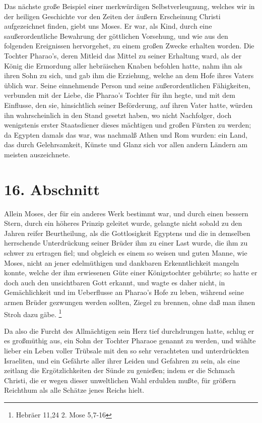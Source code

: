  Das nächste große Beispiel einer merkwürdigen
Selbstverleugnung, welches wir in
der heiligen Geschichte vor den Zeiten der äußern Erscheinung Christi
aufgezeichnet finden, giebt uns Moses. Er war, als Kind, durch eine
saußerordentliche Bewahrung der göttlichen Vorsehung, und wie aus den folgenden
Ereignissen hervorgehet, zu einem großen Zwecke erhalten worden. Die Tochter
Pharao’s,  deren Mitleid das Mittel zu seiner Erhaltung ward, als der König die
Ermordung aller hebräischen Knaben befohlen hatte, nahm ihn als ihren Sohn zu
sich, und gab ihm die Erziehung, welche an dem Hofe ihres Vaters üblich war.
Seine einnehmende Person und seine außerordentlichen Fähigkeiten, verbunden mit
der Liebe, die Pharao’s Tochter für ihn hegte, und mit dem Einflusse, den sie,
hinsichtlich seiner Beförderung, auf ihren Vater hatte, würden ihn
wahrscheinlich in den Stand gesetzt haben, wo nicht Nachfolger, doch wenigstenis
erster Staatsdiener dieses mächtigen und großen Fürsten zu werden; da
Egypten  damals das war, was nachmalß Athen
 und Rom  wurden: ein Land, das
durch Gelehrsamkeit, Künste und Glanz sich vor allen andern Ländern am meisten
auszeichnete.

\section{16. Abschnitt} \label{kap4_ab16}

Allein Moses, der für ein anderes Werk bestimmt war, und durch einen bessern
Stern, durch ein höheres Prinzip geleitet wurde, gelangte nicht sobald zu den
Jahren reifer Beurtheilung, als die Gottlosigkeit Egyptens und die in demselben
herrschende Unterdrückung seiner Brüder ihm zu einer Last wurde, die ihm zu
schwer zu ertragen fiel; und obgleich es einem so weisen und guten Manne, wie
Moses, nicht an jener edelmüthigen und dankbaren Erkenntlichkeit mangeln
konnte, welche der ihm erwiesenen Güte einer Königstochter gebührte; so hatte er
doch auch den unsichtbaren Gott erkannt, und wagte es daher nicht, in
Gemächlichkeit und im Ueberflusse an Pharao's Hofe zu leben, während seine armen
Brüder gezwungen werden sollten, Ziegel zu brennen, ohne daß man ihnen Stroh
dazu gäbe.
\footnote{Hebräer 11,24 2. Mose 5,7-16}

\medskip

Da also die Furcht des Allmächtigen sein Herz tief durchdrungen hatte, schlug er
es großmüthig aus, ein Sohn der Tochter Pharaoe genannt zu werden, und wählte
lieber ein Leben voller Trübsale mit den so sehr verachteten und unterdrückten
Israeliten, und ein Gefährte aller ihrer Leiden und Gefahren zu sein, als eine
zeitlang die Ergötzlichkeiten der Sünde zu genießen; indem er die Schmach
Christi, die er wegen dieser unweltlichen Wahl erdulden mußte, für größern
Reichthum als alle Schätze jenes Reichs hielt.

